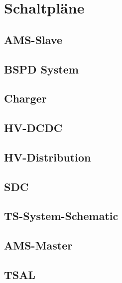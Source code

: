 
%
%
%
%

\section{Schaltpläne}
\subsection{\ac{AMS}-Slave}

\subsection{\ac{BSPD} System}

\subsection{Charger}

\subsection{\ac{HV}-DCDC}

\subsection{HV-Distribution}

\subsection{\ac{SDC}}

\subsection{\ac{TS}-System-Schematic}

\subsection{\ac{AMS}-Master}

\subsection{\ac{TSAL}}

